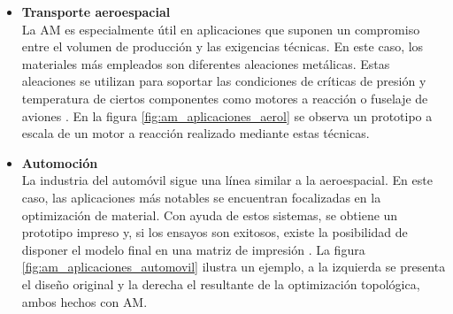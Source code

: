 \begin{itemize}
    \item \textbf{Transporte aeroespacial}\\
    La AM es especialmente útil en aplicaciones que suponen un compromiso entre el volumen de producción y las exigencias técnicas. En este caso, los materiales más empleados son diferentes aleaciones metálicas. Estas aleaciones se utilizan para soportar las condiciones de críticas de presión y temperatura de ciertos componentes como motores a reacción o fuselaje de aviones \cite{BlakeyMiner2021}. En la figura \ref{fig:am_aplicaciones_aerol} se observa un prototipo a escala de un motor a reacción realizado mediante estas técnicas.
    
    \item \textbf{Automoción}\\
    La industria del automóvil sigue una línea similar a la aeroespacial. En este caso, las aplicaciones más notables se encuentran focalizadas en la optimización de material. Con ayuda de estos sistemas, se obtiene un prototipo impreso y, si los ensayos son exitosos, existe la posibilidad de disponer el modelo final en una matriz de impresión \cite{Zhao_2023}. La figura \ref{fig:am_aplicaciones_automovil} ilustra un ejemplo, a la izquierda se presenta el diseño original y la derecha el resultante de la optimización topológica, ambos hechos con \acrshort{AM}.
    

\end{itemize}
